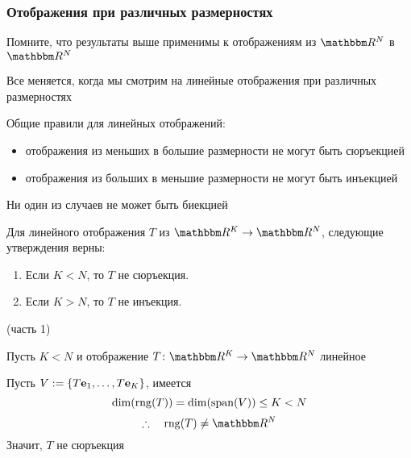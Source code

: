 \begin{frame}

    \frametitle{Отображения при различных размерностях} 

    \vspace{2em}
    Помните, что результаты выше применимы к отображениям из $\RR^N$ в $\RR^N$

    Все меняется, когда мы смотрим на линейные отображения при различных размерностях

    \vspace{.7em}

    Общие правили для линейных отображений: 

    \begin{itemize}
        \item отображения из меньших в большие размерности не могут быть сюръекцией
        \item отображения из больших в меньшие размерности не могут быть инъекцией
    \end{itemize}

    Ни один из случаев не может быть биекцией

    \vspace{1em}

\end{frame}

\begin{frame}
    
    \vspace{2em}
    \Thm{\eqref{ET-t:lfoc}}
    Для линейного отображения $T$ из $\RR^K \to \RR^N$, следующие утверждения верны:
    \begin{enumerate}
        \item Если $K < N$, то $T$ не сюръекция.
        \item Если $K > N$, то $T$ не инъекция.
    \end{enumerate}
    \Prf(часть 1)
    
    Пусть $K < N$ и отображение $T \colon \RR^K \to \RR^N$ линейное  
    
    Пусть $V := \{T{\mathbf e}_1, \ldots, T{\mathbf e}_K\}$, имеется
    $$
    \dim(\operatorname{rng}(T)) = \dim(\operatorname{span}(V)) \leq K < N
    $$
    $$
    \fore 
        \range(T) \not= \RR^N
    $$
    Значит, $T$ не сюръекция 
    
\end{frame}

